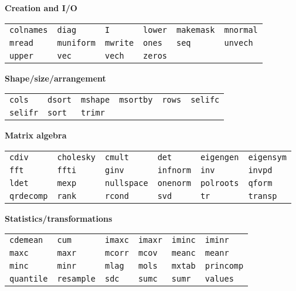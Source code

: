 \textbf{Creation and I/O}
\hrulefill

\begin{tabular}{p{\cwid}p{\cwid}p{\cwid}p{\cwid}p{\cwid}p{\cwid}}
\texttt{colnames} &
\texttt{diag} &
\texttt{I} &
\texttt{lower} &
\texttt{makemask} &
\texttt{mnormal} \\
\texttt{mread} &
\texttt{muniform} &
\texttt{mwrite} &
\texttt{ones} &
\texttt{seq} &
\texttt{unvech} \\
\texttt{upper} &
\texttt{vec} &
\texttt{vech} &
\texttt{zeros} & & \\ [4pt]
\end{tabular}

\textbf{Shape/size/arrangement}
\hrulefill

\begin{tabular}{p{\cwid}p{\cwid}p{\cwid}p{\cwid}p{\cwid}p{\cwid}}
\texttt{cols} &
\texttt{dsort} &
\texttt{mshape} &
\texttt{msortby} &
\texttt{rows} &
\texttt{selifc} \\
\texttt{selifr} &
\texttt{sort} &
\texttt{trimr} & & & \\ [4pt]
\end{tabular}

\textbf{Matrix algebra}
\hrulefill

\begin{tabular}{p{\cwid}p{\cwid}p{\cwid}p{\cwid}p{\cwid}p{\cwid}}
\texttt{cdiv} &
\texttt{cholesky} &
\texttt{cmult} &
\texttt{det} &
\texttt{eigengen} &
\texttt{eigensym} \\
\texttt{fft} &
\texttt{ffti} &
\texttt{ginv} &
\texttt{infnorm} &
\texttt{inv} &
\texttt{invpd} \\
\texttt{ldet} &
\texttt{mexp} &
\texttt{nullspace} &
\texttt{onenorm} &
\texttt{polroots} &
\texttt{qform} \\
\texttt{qrdecomp} &
\texttt{rank} &
\texttt{rcond} &
\texttt{svd} &
\texttt{tr} &
\texttt{transp} \\ [4pt]
\end{tabular}

\textbf{Statistics/transformations}
\hrulefill

\begin{tabular}{p{\cwid}p{\cwid}p{\cwid}p{\cwid}p{\cwid}p{\cwid}}
\texttt{cdemean} &
\texttt{cum} &
\texttt{imaxc} &
\texttt{imaxr} &
\texttt{iminc} &
\texttt{iminr} \\
\texttt{maxc} &
\texttt{maxr} &
\texttt{mcorr} &
\texttt{mcov} &
\texttt{meanc} &
\texttt{meanr} \\
\texttt{minc} &
\texttt{minr} &
\texttt{mlag} &
\texttt{mols} &
\texttt{mxtab} &
\texttt{princomp} \\
\texttt{quantile} &
\texttt{resample} &
\texttt{sdc} &
\texttt{sumc} &
\texttt{sumr} &
\texttt{values} \\ [4pt]
\end{tabular}

